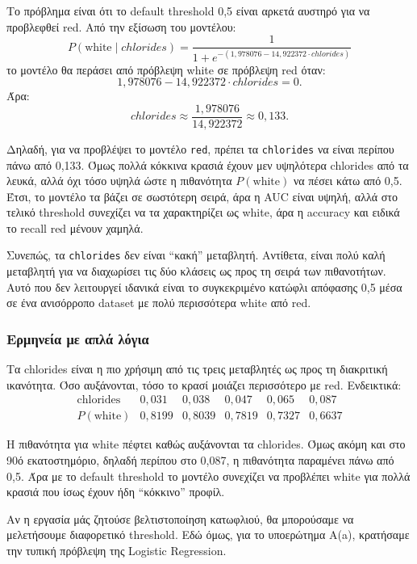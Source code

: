 \documentclass[11pt,a4paper]{article}
\newcommand{\code}[1]{\texttt{#1}}
\begin{document}
Το πρόβλημα είναι ότι το default threshold 0,5 είναι αρκετά αυστηρό για να
προβλεφθεί red. Από την εξίσωση του μοντέλου:
\[
P(\text{white} \mid chlorides) =
\frac{1}{1 + e^{-(1{,}978076 - 14{,}922372 \cdot chlorides)}}
\]
το μοντέλο θα περάσει από πρόβλεψη white σε πρόβλεψη red όταν:
\[
1{,}978076 - 14{,}922372 \cdot chlorides = 0.
\]
Άρα:
\[
chlorides \approx \frac{1{,}978076}{14{,}922372} \approx 0{,}133.
\]

Δηλαδή, για να προβλέψει το μοντέλο \code{red}, πρέπει τα \code{chlorides}
να είναι περίπου πάνω από 0,133. Όμως πολλά κόκκινα κρασιά έχουν μεν
υψηλότερα chlorides από τα λευκά, αλλά όχι τόσο υψηλά ώστε η πιθανότητα
\(P(\text{white})\) να πέσει κάτω από 0,5. Έτσι, το μοντέλο τα βάζει σε
σωστότερη σειρά, άρα η AUC είναι υψηλή, αλλά στο τελικό threshold συνεχίζει
να τα χαρακτηρίζει ως white, άρα η accuracy και ειδικά το recall red μένουν
χαμηλά.

Συνεπώς, τα \code{chlorides} δεν είναι ``κακή'' μεταβλητή. Αντίθετα, είναι
πολύ καλή μεταβλητή για να διαχωρίσει τις δύο κλάσεις ως προς τη σειρά των
πιθανοτήτων. Αυτό που δεν λειτουργεί ιδανικά είναι το συγκεκριμένο
κατώφλι απόφασης 0,5 μέσα σε ένα ανισόρροπο dataset με πολύ περισσότερα
white από red.

\subsubsection{Ερμηνεία με απλά λόγια}

Τα chlorides είναι η πιο χρήσιμη από τις τρεις μεταβλητές ως προς τη
διακριτική ικανότητα. Όσο αυξάνονται, τόσο το κρασί μοιάζει περισσότερο με
red. Ενδεικτικά:
\[
\begin{array}{c|ccccc}
\text{chlorides} & 0{,}031 & 0{,}038 & 0{,}047 & 0{,}065 & 0{,}087 \\
\hline
P(\text{white}) & 0{,}8199 & 0{,}8039 & 0{,}7819 & 0{,}7327 & 0{,}6637
\end{array}
\]

Η πιθανότητα για white πέφτει καθώς αυξάνονται τα chlorides. Όμως ακόμη και
στο 90ό εκατοστημόριο, δηλαδή περίπου στο 0,087, η πιθανότητα παραμένει
πάνω από 0,5. Άρα με το default threshold το μοντέλο συνεχίζει να προβλέπει
white για πολλά κρασιά που ίσως έχουν ήδη ``κόκκινο'' προφίλ.

Αν η εργασία μάς ζητούσε βελτιστοποίηση κατωφλιού, θα μπορούσαμε να
μελετήσουμε διαφορετικό threshold. Εδώ όμως, για το υποερώτημα Α(a),
κρατήσαμε την τυπική πρόβλεψη της Logistic Regression.
\end{document}
